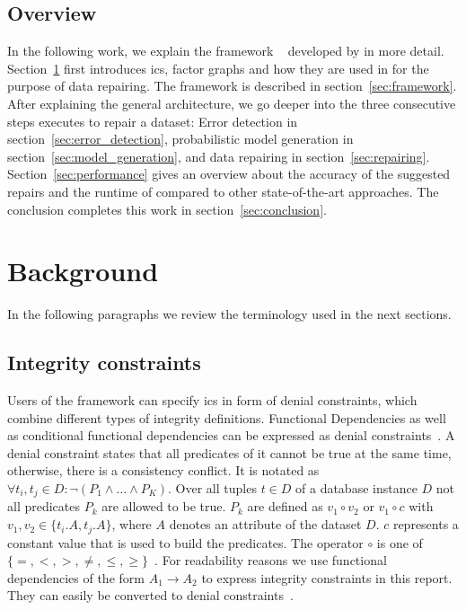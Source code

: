   \subsection{Overview}
  In the following work, we explain the framework \holoclean{}~\cite{holoclean} developed by \citeauthor{holoclean} in more detail.
  Section~\ref{sec:background} first introduces \glspl{ic}, factor graphs and how they are used in \deepdive{} for the purpose of data repairing.
  The \holoclean{} framework is described in section~\ref{sec:framework}.
  After explaining the general architecture, we go deeper into the three consecutive steps \holoclean{} executes to repair a dataset: Error detection in section~\ref{sec:error_detection}, probabilistic model generation in section~\ref{sec:model_generation}, and data repairing in section~\ref{sec:repairing}.
  Section~\ref{sec:performance} gives an overview about the accuracy of the suggested repairs and the runtime of \holoclean{} compared to other state-of-the-art approaches.
  The conclusion completes this work in section~\ref{sec:conclusion}.


\section{Background}\label{sec:background}
  In the following paragraphs we review the terminology used in the next sections.
  
  \subsection{Integrity constraints}
  Users of the \holoclean{} framework can specify \glspl{ic} in form of denial constraints, which combine different types of integrity definitions.
  Functional Dependencies as well as conditional functional dependencies can be expressed as denial constraints~\cite{fd_to_dc}.
  A denial constraint states that all predicates of it cannot be true at the same time, otherwise, there is a consistency conflict.
  It is notated as $\forall t_i, t_j \in D: \neg(P_1 \wedge \dots \wedge P_K)$.
  Over all tuples $t \in D$ of a database instance $D$ not all predicates $P_k$ are allowed to be true.
  $P_k$ are defined as $v_1 \circ v_2$ or $v_1 \circ c$ with $v_1, v_2 \in \{t_i.A, t_j.A\}$, where $A$ denotes an attribute of the dataset $D$.
  $c$ represents a constant value that is used to build the predicates.
  The operator $\circ$ is one of $\{=,<,>,\neq,\leq,\geq\}$~\cite{chu2013discoveringdc}.
  For readability reasons we use functional dependencies of the form $A_1 \to A_2$ to express integrity constraints in this report.
  They can easily be converted to denial constraints~\cite{fd_to_dc}.
  
